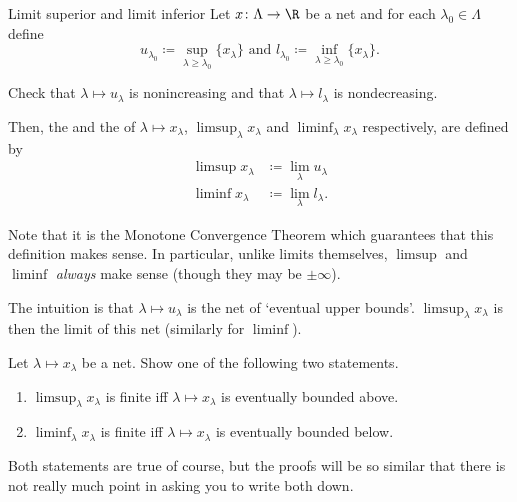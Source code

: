 \begin{dfn}{Limit superior and limit inferior}{}
Let $x\colon \Lambda \rightarrow \R$ be a net and for each $\lambda _0\in \Lambda$ define
\begin{equation}\label{3.3.48}
u_{\lambda _0}\coloneqq \sup _{\lambda \geq \lambda _0}\{ x_\lambda \} \text{ and }l_{\lambda _0}\coloneqq \inf _{\lambda \geq \lambda _0}\{ x_\lambda \} .
\end{equation}
\begin{exr}[breakable=false]{}{}
Check that $\lambda \mapsto u_\lambda$ is nonincreasing and that $\lambda \mapsto l_\lambda$ is nondecreasing.
\end{exr}
Then, the  and the  of $\lambda \mapsto x_{\lambda}$, $\limsup _{\lambda}x_{\lambda}$ and $\liminf _{\lambda}x_{\lambda}$ respectively, are defined by
\begin{subequations}\label{3.3.50}
\begin{align}
\limsup x_\lambda & \coloneqq \lim _\lambda u_\lambda \\
\liminf x_\lambda &\coloneqq \lim _\lambda l_\lambda .
\end{align}
\end{subequations}
\begin{rmk}
Note that it is the Monotone Convergence Theorem which guarantees that this definition makes sense.  In particular, unlike limits themselves, $\limsup$ and $\liminf$ \emph{always} make sense (though they may be $\pm \infty$).
\end{rmk}
\begin{rmk}
The intuition is that $\lambda \mapsto u_\lambda$ is the net of `eventual upper bounds'.  $\limsup _\lambda x_\lambda$ is then the limit of this net (similarly for $\liminf$).
\end{rmk}
\end{dfn}
\begin{exr}{}{}
Let $\lambda \mapsto x_\lambda$ be a net.  Show one of the following two statements.
\begin{enumerate}
\item $\limsup _\lambda x_\lambda$ is finite iff $\lambda \mapsto x_\lambda$ is eventually bounded above.
\item $\liminf _\lambda x_\lambda$ is finite iff $\lambda \mapsto x_\lambda$ is eventually bounded below.
\end{enumerate}
\begin{rmk}
Both statements are true of course, but the proofs will be so similar that there is not really much point in asking you to write both down.
\end{rmk}
\end{exr}
